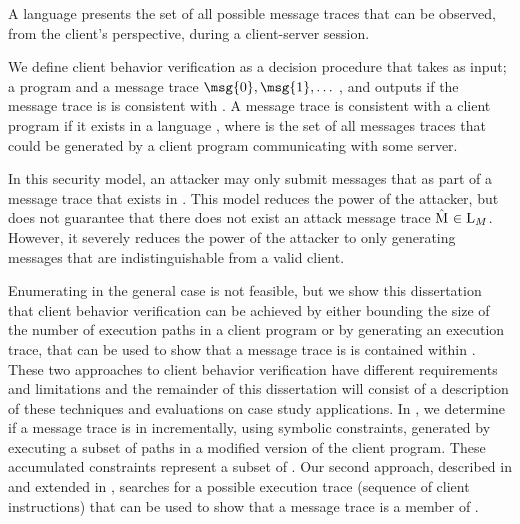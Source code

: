 \begin{definition}
  A language \msgLang{\program{}} presents the set of all possible message
  traces \messageTrace{} that can be observed, from the client's
  perspective, during a client-server
  session.
\end{definition}

We define client behavior verification as a decision procedure that
takes as input; a program \program{} and a message trace $\msg{0},
\msg{1}, \ldots$ \msg{\msgNmbr}, and outputs if the message trace is
is consistent with \program{}.
A message trace is consistent with a client program \program{} if it
exists in a language  \msgLang{\program{}}, where \msgLang{\program{}}
is the set of all messages traces that could be generated by a client
program \program{} communicating with some server.

In this security model, an attacker may only submit messages that as
part of a message trace that exists in \msgLang{\program}. This model
reduces the power of the attacker, but does not guarantee
that there does not exist an attack message trace $\mathrm{\hat{M}_{}}
\in \mathrm{L}_{M}$. However, it severely reduces the power of
the attacker to only generating messages that are indistinguishable
from a valid client.

Enumerating \msgLang{\program{}} in the general
case is not feasible, but we show this dissertation that client
behavior verification can be achieved by either bounding the size of
the number of execution paths in a client program or by generating an
execution trace, that can be used to show that a message trace is 
is contained within \msgLang{\program{}}.
These two approaches to client behavior verification have different
requirements and limitations and the remainder of this dissertation
will consist of a description of these techniques and evaluations on
case study applications. In , we determine if a message
trace is in \msgLang{\program} incrementally, using symbolic
constraints, generated by executing a subset of paths in a modified
version of the client program. These accumulated constraints represent
a subset of \msgLang{\program}. Our second approach, described in
 and extended in , searches for a
possible execution trace (sequence of client instructions) that can be
used to show that a message trace is a member of \msgLang{\program}.

